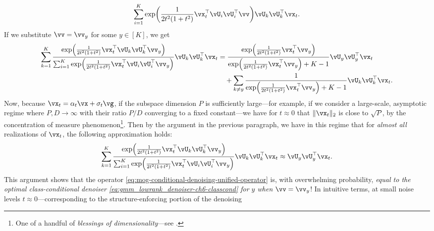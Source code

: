\documentclass[../../book-main.tex]{subfiles}
\begin{document}
\begin{example}
\begin{equation}
{    }
    {
      \sum_{i
      = 1}^{K}\exp\rp{\frac{1}{2t^{2}(1
      + t^{2})}\vx_t^\top \vU_i \vU_i^\top \vv}
    }
    \vU_{k}\vU_{k}^{\top}\vx_t.
  \end{equation}
  If we substitute $\vv = \vv_y$ for some $y \in [K]$, we get
  \begin{align}
    \begin{split}
    \sum_{k = 1}^{K}
    \frac{
      \exp\rp{\frac{1}{2t^{2}(1
      + t^{2})}\vx_t^\top \vU_k \vU_k^\top \vv_y}
    }
    {
      \sum_{i
      = 1}^{K}\exp\rp{\frac{1}{2t^{2}(1
      + t^{2})}\vx_t^\top \vU_i \vU_i^\top \vv_y}
    }
    \vU_{k}\vU_{k}^{\top}\vx_t
    &=
    \frac{
      \exp\rp{\frac{1}{2t^{2}(1
      + t^{2})}\vx_t^\top \vv_y}
    }
    {
      \exp\rp{\frac{1}{2t^{2}(1
      + t^{2})}\vx_t^\top \vv_y}
      + K-1
    }
    \vU_{y}\vU_{y}^{\top}\vx_t
    \\
    &\quad+
    \sum_{k \neq y}
    \frac{
      1
    }
    {
      \exp\rp{\frac{1}{2t^{2}(1
      + t^{2})}\vx_t^\top \vv_y}
      + K-1
    }
    \vU_{k}\vU_{k}^{\top}\vx_t.
    \end{split}
  \end{align}
  Now, because $\vx_t = \alpha_t \vx + \sigma_t \vg$, if the subspace dimension
  $P$ is sufficiently large---for example, if we consider a large-scale,
  asymptotic regime where $P, D \to \infty$ with their ratio $P/D$ converging to
  a fixed constant---we have for $t \approx 0$ that $\norm{\vx_t}_2$ is close to
  $\sqrt{P}$, by the concentration of measure phenomenon\footnote{One of
  a handful of \textit{blessings of dimensionality}---see
  \textcite{Wright-Ma-2022}.}. Then
  by the argument in the previous paragraph, we have in this regime that for
  \textit{almost all} realizations of $\vx_t$, the following approximation
  holds:
  \begin{equation}
    \sum_{k = 1}^{K}
    \frac{
      \exp\rp{\frac{1}{2t^{2}(1
      + t^{2})}\vx_t^\top \vU_k \vU_k^\top \vv_y}
    }
    {
      \sum_{i
      = 1}^{K}\exp\rp{\frac{1}{2t^{2}(1
      + t^{2})}\vx_t^\top \vU_i \vU_i^\top \vv_y}
    }
    \vU_{k}\vU_{k}^{\top}\vx_t
    \approx
    \vU_{y}\vU_{y}^{\top}\vx_t.
  \end{equation}
  This argument shows that the operator
  \eqref{eq:mog-conditional-denoising-unified-operator} is, with overwhelming
  probability, \textit{equal to the optimal class-conditional denoiser
  \eqref{eq:gmm_lowrank_denoiser-ch6-classcond} for $y$
  when $\vv = \vv_y$}! In intuitive terms, at small noise levels $t \approx
  0$---corresponding to the structure-enforcing portion of the denoising

\end{example}
\end{document}
